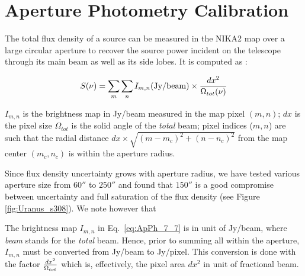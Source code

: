 \section{Aperture Photometry Calibration}%

The total flux density of a source can be measured in the NIKA2 map
over a large circular aperture to recover the source power incident on the telescope through its main
beam as well as its side lobes. It is computed as :

\begin{equation}
S(\nu) = \sum_{m} \sum_{n}  I_{m,n} ({\rm Jy/beam}) \times {dx^2 \over {\Omega_{tot}(\nu)}}
\label{eq:ApPh_7_7}
\end{equation}

\noindent  $I_{m,n}$ is the brightness map in Jy/beam measured in the
map pixel $(m,n)$; $dx$ is the pixel size 
$\Omega_{tot}$ is the solid angle of the {\it total} beam; pixel
indices ($m,n$) are such that the radial distance $dx \times
\sqrt{(m-m_c)^2 + (n-n_c)^2}$ from the map center $(m_c,n_c)$
is within the aperture radius. 

Since flux density uncertainty grows with aperture radius, we have
tested various aperture size from $60''$ to $250''$ and found that
$150''$ is a good compromise between
uncertainty and full saturation of the flux density (see Figure
\ref{fig:Uranus_s308}).
We note however that 


The brightness map $I_{m,n}$ in Eq.~\ref{eq:ApPh_7_7} is in unit of
Jy/beam, where {\it beam} stands for the {\it total} beam.
Hence, prior to summing all  within the aperture, $I_{m,n}$
must be converted from  Jy/beam to Jy/pixel. This
conversion is done with the factor $dx^2 \over {\Omega_{tot}}$
which is, effectively, the pixel area $dx^2$ in unit of fractional
beam. 

